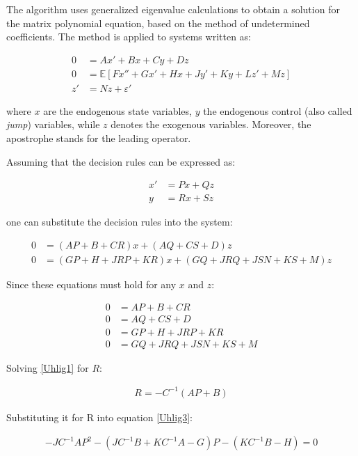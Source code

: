 \documentclass{pracamgr}
\numberwithin{equation}{section}
\begin{document}
The \citet{uhlig1998toolkit} algorithm uses generalized eigenvalue calculations to obtain a solution for the matrix polynomial equation, based on the method of undetermined coefficients. The method is applied to systems written as:

\begin{align}
0 &= Ax' + Bx + Cy + Dz \nonumber \\
0 &=\mathbb{E} \left[Fx'' + Gx' + Hx + Jy' + Ky + Lz' + Mz \right] \nonumber \\
z' &= Nz + \varepsilon'
\end{align}

where $x$ are the endogenous state variables, $y$ the endogenous control (also called \textit{jump}) variables, while $z$ denotes the exogenous variables. Moreover, the apostrophe stands for the leading operator.

Assuming that the decision rules can be expressed as:

\begin{align}
x' &= Px + Qz \nonumber \\
y &= Rx + Sz
\end{align}

one can substitute the decision rules into the system:

\begin{align}
0 &= (AP+B+CR)x+(AQ+CS+D)z \nonumber \\
0 &= (GP+H+JRP+KR)x+(GQ+JRQ+JSN+KS+M)z
\end{align}

Since these equations must hold for any $x$ and $z$:

\begin{align}
0 &= AP+B+CR  \label{Uhlig1} \\
0 &= AQ+CS+D  \label{Uhlig2} \\
0 &= GP+H+JRP+KR  \label{Uhlig3} \\
0 &= GQ+JRQ+JSN+KS+M \label{Uhlig4}
\end{align}

Solving \ref{Uhlig1} for $R$:

\begin{align}
R = -C^{-1} \left(AP + B \right)
\end{align}

Substituting it for R into equation \ref{Uhlig3}:

\begin{align}
-JC^{-1}AP^{2} - \left(JC^{-1}B + KC^{-1}A - G \right)P - \left(KC^{-1}B - H \right) = 0
\end{align} 
\end{document}
